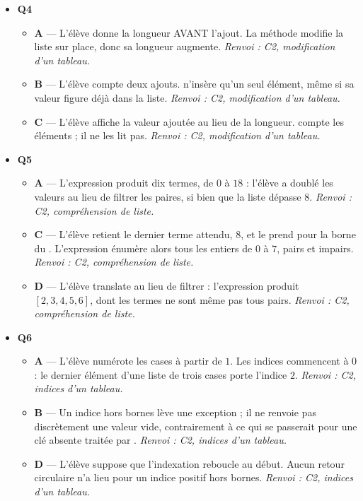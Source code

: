 \begin{itemize}
\begin{itemize}
  \end{itemize}
  \item \textbf{Q4}
  \begin{itemize}
    \item \textbf{A} — L'élève donne la longueur AVANT l'ajout. La méthode  modifie la liste sur place, donc sa longueur augmente. \emph{Renvoi : C2, modification d'un tableau.}
    \item \textbf{B} — L'élève compte deux ajouts.  n'insère qu'un seul élément, même si sa valeur figure déjà dans la liste. \emph{Renvoi : C2, modification d'un tableau.}
    \item \textbf{C} — L'élève affiche la valeur ajoutée au lieu de la longueur.  compte les éléments ; il ne les lit pas. \emph{Renvoi : C2, modification d'un tableau.}
  \end{itemize}
  \item \textbf{Q5}
  \begin{itemize}
    \item \textbf{A} — L'expression produit dix termes, de $0$ à $18$ : l'élève a doublé les valeurs au lieu de filtrer les paires, si bien que la liste dépasse $8$. \emph{Renvoi : C2, compréhension de liste.}
    \item \textbf{C} — L'élève retient le dernier terme attendu, $8$, et le prend pour la borne du . L'expression énumère alors tous les entiers de $0$ à $7$, pairs et impairs. \emph{Renvoi : C2, compréhension de liste.}
    \item \textbf{D} — L'élève translate au lieu de filtrer : l'expression produit $[2, 3, 4, 5, 6]$, dont les termes ne sont même pas tous pairs. \emph{Renvoi : C2, compréhension de liste.}
  \end{itemize}
  \item \textbf{Q6}
  \begin{itemize}
    \item \textbf{A} — L'élève numérote les cases à partir de $1$. Les indices commencent à $0$ : le dernier élément d'une liste de trois cases porte l'indice $2$. \emph{Renvoi : C2, indices d'un tableau.}
    \item \textbf{B} — Un indice hors bornes lève une exception ; il ne renvoie pas discrètement une valeur vide, contrairement à ce qui se passerait pour une clé absente traitée par . \emph{Renvoi : C2, indices d'un tableau.}
    \item \textbf{D} — L'élève suppose que l'indexation reboucle au début. Aucun retour circulaire n'a lieu pour un indice positif hors bornes. \emph{Renvoi : C2, indices d'un tableau.}

\end{itemize}
\end{itemize}
